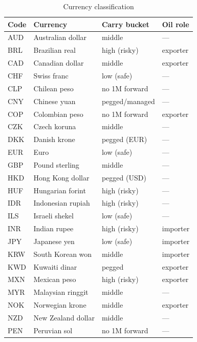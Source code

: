 \begin{table}[htbp]
\centering
\begin{threeparttable}
\caption{Currency classification}
\label{tab:app_ccy}
\small
\begin{tabular}{ll l l}
\toprule
Code & Currency & Carry bucket & Oil role \\
\midrule
AUD & Australian dollar   & middle            & --- \\
BRL & Brazilian real      & high (risky)      & exporter \\
CAD & Canadian dollar     & middle            & exporter \\
CHF & Swiss franc         & low (safe)        & --- \\
CLP & Chilean peso        & no 1M forward     & --- \\
CNY & Chinese yuan        & pegged/managed    & --- \\
COP & Colombian peso      & no 1M forward     & exporter \\
CZK & Czech koruna        & middle            & --- \\
DKK & Danish krone        & pegged (EUR)      & --- \\
EUR & Euro                & low (safe)        & --- \\
GBP & Pound sterling      & middle            & --- \\
HKD & Hong Kong dollar    & pegged (USD)      & --- \\
HUF & Hungarian forint    & high (risky)      & --- \\
IDR & Indonesian rupiah   & high (risky)      & --- \\
ILS & Israeli shekel      & low (safe)        & --- \\
INR & Indian rupee        & high (risky)      & importer \\
JPY & Japanese yen        & low (safe)        & importer \\
KRW & South Korean won    & middle            & importer \\
KWD & Kuwaiti dinar       & pegged            & exporter \\
MXN & Mexican peso        & high (risky)      & exporter \\
MYR & Malaysian ringgit   & middle            & --- \\
NOK & Norwegian krone     & middle            & exporter \\
NZD & New Zealand dollar  & middle            & --- \\
PEN & Peruvian sol        & no 1M forward     & --- \\

\end{tabular}
\end{threeparttable}
\end{table}
